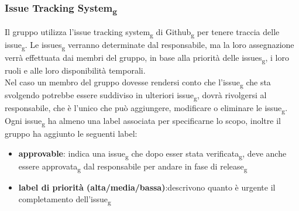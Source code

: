 \subsubsection{Issue Tracking System\textsubscript{g}}
Il gruppo utilizza l'issue tracking system\textsubscript{g} di Github\textsubscript{g} per tenere traccia delle issue\textsubscript{g}. 
Le issues\textsubscript{g} verranno determinate dal responsabile, ma la loro assegnazione verrà effettuata dai membri del gruppo, in base alla priorità delle issues\textsubscript{g}, i loro ruoli e alle loro disponibilità temporali.\\
Nel caso un membro del gruppo dovesse rendersi conto che l'issue\textsubscript{g} che sta svolgendo potrebbe essere suddiviso in ulteriori issue\textsubscript{g}, dovrà rivolgersi al responsabile, che è l'unico che può aggiungere, modificare o eliminare le issue\textsubscript{g}.\\
Ogni issue\textsubscript{g} ha almeno una label associata per specificarne lo scopo, inoltre il gruppo ha aggiunto le seguenti label:
\begin{itemize}
	\item \textbf{approvable}: indica una issue\textsubscript{g} che dopo esser stata verificata\textsubscript{g}, deve anche essere approvata\textsubscript{g} dal responsabile per andare in fase di release\textsubscript{g}
	\item \textbf{label di priorità (alta/media/bassa)}:descrivono quanto è urgente il completamento dell'issue\textsubscript{g} 
\end{itemize}